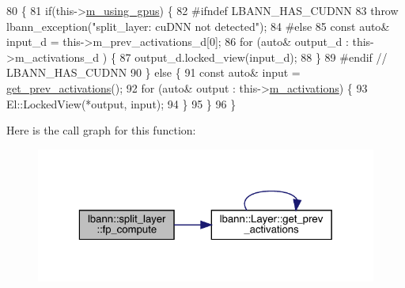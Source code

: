 \begin{DoxyCode}
80                              \{
81     \textcolor{keywordflow}{if}(this->\hyperlink{classlbann_1_1Layer_af7881cb5eff5207c15fa835d65462e8f}{m\_using\_gpus}) \{
82 \textcolor{preprocessor}{  #ifndef LBANN\_HAS\_CUDNN}
83       \textcolor{keywordflow}{throw} lbann\_exception(\textcolor{stringliteral}{"split\_layer: cuDNN not detected"});
84 \textcolor{preprocessor}{  #else}
85       \textcolor{keyword}{const} \textcolor{keyword}{auto}& input\_d = this->m\_prev\_activations\_d[0];
86       \textcolor{keywordflow}{for} (\textcolor{keyword}{auto}& output\_d : this->m\_activations\_d ) \{
87         output\_d.locked\_view(input\_d);
88       \}
89 \textcolor{preprocessor}{  #endif // LBANN\_HAS\_CUDNN}
90     \} \textcolor{keywordflow}{else} \{
91       \textcolor{keyword}{const} \textcolor{keyword}{auto}& input = \hyperlink{classlbann_1_1Layer_a45853df73a2e72bfaa774665a0f37ed7}{get\_prev\_activations}();
92       \textcolor{keywordflow}{for} (\textcolor{keyword}{auto}& output : this->\hyperlink{classlbann_1_1Layer_a7caf08e938141d1584e6939cefa4baed}{m\_activations}) \{
93         El::LockedView(*output, input);
94       \}
95     \}
96   \}
\end{DoxyCode}
Here is the call graph for this function\+:\nopagebreak
\begin{figure}[H]
\begin{center}
\leavevmode
\includegraphics[width=323pt]{classlbann_1_1split__layer_aeb4caccd2675195ce75ae63485f6d402_cgraph}
\end{center}
\end{figure}
\mbox{\label{classlbann_1_1split__layer_ad206038eac236a971664ccacec8faa82}} 
